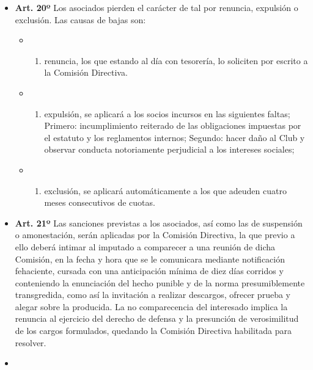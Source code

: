 \documentclass[]{book}
\providecommand{\tightlist}{%
  \setlength{\itemsep}{0pt}\setlength{\parskip}{0pt}}
\begin{document}
\begin{itemize}
\item
  \textbf{Art. 20º} Los asociados pierden el carácter de tal por
  renuncia, expulsión o exclusión. Las causas de bajas son:

  \begin{itemize}
  \item
    \begin{enumerate}
    \def\labelenumi{\alph{enumi})}
    \tightlist
    \item
      renuncia, los que estando al día con tesorería, lo soliciten por
      escrito a la Comisión Directiva.
    \end{enumerate}
  \item
    \begin{enumerate}
    \def\labelenumi{\alph{enumi})}
    \setcounter{enumi}{1}
    \tightlist
    \item
      expulsión, se aplicará a los socios incursos en las siguientes
      faltas; Primero: incumplimiento reiterado de las obligaciones
      impuestas por el estatuto y los reglamentos internos; Segundo:
      hacer daño al Club y observar conducta notoriamente perjudicial a
      los intereses sociales;
    \end{enumerate}
  \item
    \begin{enumerate}
    \def\labelenumi{\alph{enumi})}
    \setcounter{enumi}{2}
    \tightlist
    \item
      exclusión, se aplicará automáticamente a los que adeuden cuatro
      meses consecutivos de cuotas.
    \end{enumerate}
  \end{itemize}
\item
  \textbf{Art. 21º} Las sanciones previstas a los asociados, así como
  las de suspensión o amonestación, serán aplicadas por la Comisión
  Directiva, la que previo a ello deberá intimar al imputado a
  comparecer a una reunión de dicha Comisión, en la fecha y hora que se
  le comunicara mediante notificación fehaciente, cursada con una
  anticipación mínima de diez días corridos y conteniendo la enunciación
  del hecho punible y de la norma presumiblemente transgredida, como así
  la invitación a realizar descargos, ofrecer prueba y alegar sobre la
  producida. La no comparecencia del interesado implica la renuncia al
  ejercicio del derecho de defensa y la presunción de verosimilitud de
  los cargos formulados, quedando la Comisión Directiva habilitada para
  resolver.
\item

\end{itemize}
\end{document}
